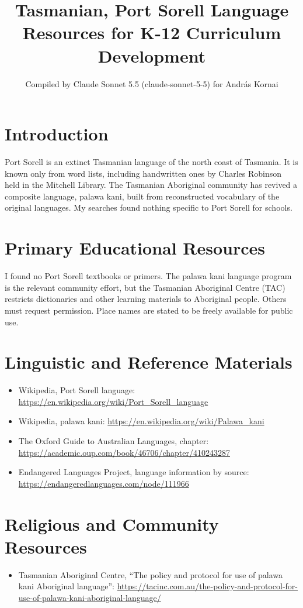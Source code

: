 \documentclass[12pt]{article}
\title{Tasmanian, Port Sorell Language Resources for K-12 Curriculum Development}
\author{Compiled by Claude Sonnet 5.5 (claude-sonnet-5-5) for Andr\'as Kornai}
\date{}
\begin{document}
\maketitle

\section{Introduction}
Port Sorell is an extinct Tasmanian language of the north coast of Tasmania. It is known only from word lists, including handwritten ones by Charles Robinson held in the Mitchell Library. The Tasmanian Aboriginal community has revived a composite language, palawa kani, built from reconstructed vocabulary of the original languages. My searches found nothing specific to Port Sorell for schools.

\section{Primary Educational Resources}
I found no Port Sorell textbooks or primers. The palawa kani language program is the relevant community effort, but the Tasmanian Aboriginal Centre (TAC) restricts dictionaries and other learning materials to Aboriginal people. Others must request permission. Place names are stated to be freely available for public use.

\section{Linguistic and Reference Materials}
\begin{itemize}
\item Wikipedia, Port Sorell language: \url{https://en.wikipedia.org/wiki/Port_Sorell_language}
\item Wikipedia, palawa kani: \url{https://en.wikipedia.org/wiki/Palawa_kani}
\item The Oxford Guide to Australian Languages, chapter: \url{https://academic.oup.com/book/46706/chapter/410243287}
\item Endangered Languages Project, language information by source: \url{https://endangeredlanguages.com/node/111966}
\end{itemize}

\section{Religious and Community Resources}
\begin{itemize}
\item Tasmanian Aboriginal Centre, ``The policy and protocol for use of palawa kani Aboriginal language'': \url{https://tacinc.com.au/the-policy-and-protocol-for-use-of-palawa-kani-aboriginal-language/}
\end{itemize}
\end{document}
